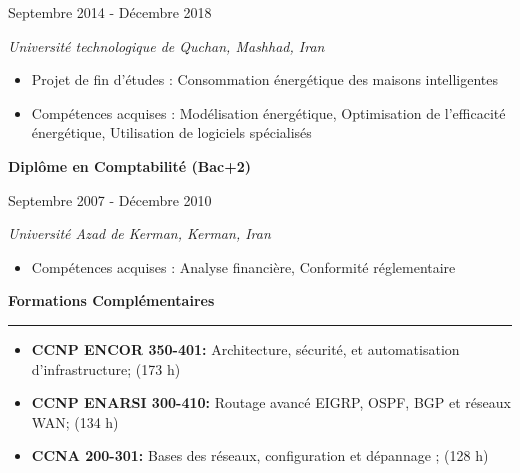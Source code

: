 \documentclass[a4paper]{letter}
\newcommand{\divider}{\rule{\linewidth}{0.9pt}}
\begin{document}
\begin{minipage}[t]{0.67\textwidth}
{\footnotesize Septembre 2014 - Décembre 2018}

{\textit{Université technologique de Quchan, Mashhad, Iran}}

\vspace{1mm}

\begin{itemize}
    \footnotesize
    \item Projet de fin d'études : Consommation énergétique des maisons intelligentes
    \item Compétences acquises : Modélisation énergétique, Optimisation de l'efficacité énergétique, Utilisation de logiciels spécialisés
\end{itemize}

\vspace{2mm}

{\textbf{Diplôme en Comptabilité (Bac+2)}}

{\footnotesize Septembre 2007 - Décembre 2010}

{\textit{Université Azad de Kerman, Kerman, Iran}}

\vspace{1mm}
\begin{itemize}


    \footnotesize
    \item Compétences acquises : Analyse financière, Conformité réglementaire
\end{itemize}
\vspace{3mm}

{\large \textbf{Formations Complémentaires}}
\divider
\vspace{4mm}
\begin{itemize}
    \footnotesize \item {\textbf{CCNP ENCOR 350-401:} Architecture, sécurité, et automatisation d'infrastructure; (173 h)}
    \vspace{2mm}
    \footnotesize \item {\textbf{CCNP ENARSI 300-410:} Routage avancé EIGRP, OSPF, BGP et réseaux WAN; (134 h)}
    \vspace{2mm}
    \footnotesize \item {\textbf{CCNA 200-301:} Bases des réseaux, configuration et dépannage ; (128 h)}
\end{itemize}
\vspace{3mm}







\end{minipage}
\end{document}

